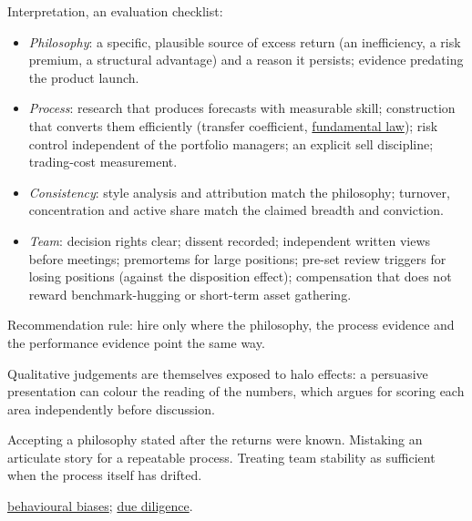 \begin{qfmethod}
 Interpretation, an evaluation checklist:
\begin{itemize}
\item \emph{Philosophy}: a specific, plausible source of excess return (an inefficiency, a risk premium, a structural advantage) and a reason it persists; evidence predating the product launch.
\item \emph{Process}: research that produces forecasts with measurable skill; construction that converts them efficiently (transfer coefficient, \hyperref[res:fundamental-law-active-management]{fundamental law}); risk control independent of the portfolio managers; an explicit sell discipline; trading-cost measurement.
\item \emph{Consistency}: style analysis and attribution match the philosophy; turnover, concentration and active share match the claimed breadth and conviction.
\item \emph{Team}: decision rights clear; dissent recorded; independent written views before meetings; premortems for large positions; pre-set review triggers for losing positions (against the disposition effect); compensation that does not reward benchmark-hugging or short-term asset gathering.
\end{itemize}
Recommendation rule: hire only where the philosophy, the process evidence and the performance evidence point the same way.

 Qualitative judgements are themselves exposed to halo effects: a persuasive presentation can colour the reading of the numbers, which argues for scoring each area independently before discussion.

 Accepting a philosophy stated after the returns were known. Mistaking an articulate story for a repeatable process. Treating team stability as sufficient when the process itself has drifted.

 \hyperref[def:behavioural-biases]{behavioural biases}; \hyperref[meth:manager-due-diligence]{due diligence}.

\end{qfmethod}

